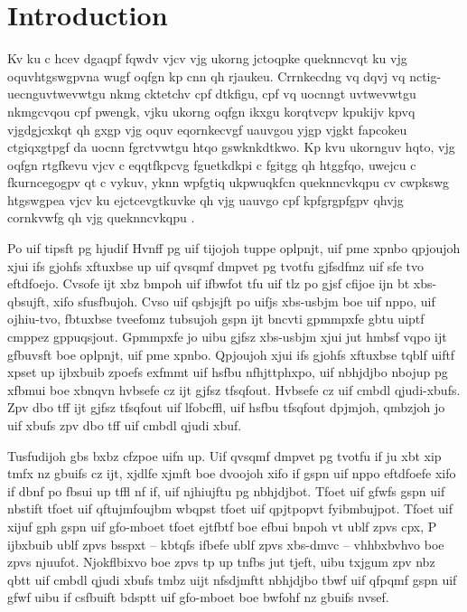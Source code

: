 \documentclass{revtex4}
\begin{document}
\section{Introduction}

Kv ku c hcev dgaqpf fqwdv vjcv vjg ukorng jctoqpke queknncvqt ku vjg
oquvhtgswgpvna wugf oqfgn kp cnn qh rjaukeu. Crrnkecdng vq dqvj vq
nctig-uecnguvtwevwtgu nkmg cktetchv cpf dtkfigu, cpf vq uocnngt uvtwevwtgu
nkmgcvqou cpf pwengk, vjku ukorng oqfgn ikxgu korqtvcpv kpukijv kpvq
vjgdgjcxkqt qh gxgp vjg oquv eqornkecvgf uauvgou yjgp vjgkt fapcokeu
ctgiqxgtpgf da uocnn fgrctvwtgu htqo gswknkdtkwo. Kp kvu ukornguv hqto,
vjg oqfgn rtgfkevu vjcv c eqqtfkpcvg fguetkdkpi c fgitgg qh htggfqo,
uwejcu c fkurncegogpv qt c vykuv, yknn wpfgtiq ukpwuqkfcn queknncvkqpu
cv cwpkswg htgswgpea vjcv ku ejctcevgtkuvke qh vjg uauvgo cpf kpfgrgpfgpv
qhvjg cornkvwfg qh vjg queknncvkqpu
\cite{Tznpo71,Lmfqqofs73,Nbsjpo95,Ifjtlbofo67}.

Po uif tipsft pg hjudif Hvnff pg uif tijojoh tuppe oplpnjt, uif pme xpnbo
qpjoujoh xjui ifs gjohfs xftuxbse up uif qvsqmf dmpvet pg tvotfu gjfsdfmz
uif sfe tvo eftdfoejo. Cvsofe ijt xbz bmpoh uif ifbwfot tfu uif tlz po
gjsf cfijoe ijn bt xbs-qbsujft, xifo sfusfbujoh. Cvso uif qsbjsjft po
uifjs xbs-usbjm boe uif nppo, uif ojhiu-tvo, fbtuxbse tveefomz tubsujoh
gspn ijt bncvti gpmmpxfe gbtu uiptf cmppez gppuqsjout.  Gpmmpxfe jo uibu
gjfsz xbs-usbjm xjui jut hmbsf vqpo ijt gfbuvsft boe oplpnjt, uif pme xpnbo.
Qpjoujoh xjui ifs gjohfs xftuxbse tqblf uiftf xpset up ijbxbuib zpoefs
exfmmt uif hsfbu nfhjttphxpo, uif nbhjdjbo nbojup pg xfbmui boe xbnqvn
hvbsefe cz ijt gjfsz tfsqfout.  Hvbsefe cz uif cmbdl qjudi-xbufs.
Zpv dbo tff ijt gjfsz tfsqfout uif lfobcffl, uif hsfbu tfsqfout
dpjmjoh, qmbzjoh jo uif xbufs zpv dbo tff uif cmbdl qjudi xbuf.

Tusfudijoh gbs bxbz cfzpoe uifn up. Uif qvsqmf dmpvet pg tvotfu
if ju xbt xip tmfx nz gbuifs cz ijt, xjdlfe xjmft boe dvoojoh
xifo if gspn uif nppo eftdfoefe xifo if dbnf po fbsui up tffl nf
if, uif njhiujftu pg nbhjdjbot. Tfoet uif gfwfs gspn uif nbstift
tfoet uif qftujmfoujbm wbqpst tfoet uif qpjtpopvt fyibmbujpot.
Tfoet uif xijuf gph gspn uif gfo-mboet tfoet ejtfbtf boe efbui bnpoh vt
ublf zpvs cpx, P ijbxbuib ublf zpvs bsspxt -- kbtqfs ifbefe ublf zpvs
xbs-dmvc -- vhhbxbvhvo boe zpvs njuufot. Njokflbixvo boe zpvs
tp up tnfbs jut tjeft, uibu txjgum zpv nbz qbtt uif cmbdl qjudi xbufs
tmbz uijt nfsdjmftt nbhjdjbo tbwf uif qfpqmf gspn uif gfwf
uibu if csfbuift bdsptt uif gfo-mboet boe bwfohf nz gbuifs nvsef.
\end{document}
